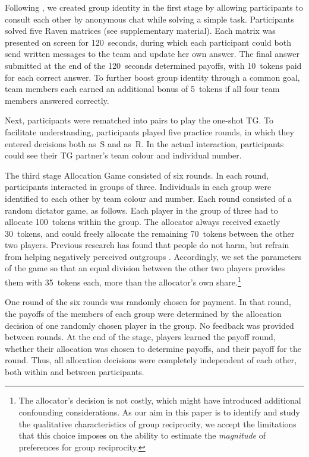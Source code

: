 \documentclass[12pt,a4paper]{article}\usepackage[]{graphicx}\usepackage[]{color}
\begin{document}
Following \citep{chen2009group}, we created group identity in the
first stage by allowing participants to consult each other by anonymous
chat while solving a simple task. Participants solved five Raven matrices
(see supplementary material). Each matrix was presented on screen
for 120~seconds, during which each participant could both send written
messages to the team and update her own answer. The final answer submitted
at the end of the 120~seconds determined payoffs, with 10~tokens
paid for each correct answer. To further boost group identity through
a common goal, team members each earned an additional bonus of 5~tokens
if all four team members answered correctly.

Next, participants were rematched into pairs to play the one-shot
TG. To facilitate understanding, participants played five practice
rounds, in which they entered decisions both as~S and as~R. In the
actual interaction, participants could see their TG partner's team
colour and individual number.

The third stage Allocation Game consisted of six rounds. In each round, participants interacted in groups of three. Individuals in each group were identified to each other by
team colour and number. Each round consisted of a random dictator game, as
follows. Each player in the group of three had to allocate 100~tokens within the
group. The allocator always received exactly 30~tokens, and could freely allocate the
remaining 70~tokens between the other two players. Previous research has found that
people do not harm, but refrain from helping negatively perceived outgroups
\citep{weisel2015ingroup}. Accordingly, we set the parameters of the game so
that an equal division between the other two players provides them with 35~tokens each, more than the allocator's own share.\footnote{
  The allocator's decision is not costly, which might have introduced additional confounding considerations. As our aim in this paper is to identify and study the qualitative characteristics of group reciprocity, we accept the limitations that this choice imposes on the ability to estimate the \emph{magnitude} of preferences for group reciprocity.
}

One round of the six rounds was randomly chosen for payment. In that round, the payoffs of the members of each group were determined by the allocation decision of one randomly chosen player in the group. No feedback was provided between rounds. At the end of the stage, players learned the payoff round, whether their allocation was chosen to determine payoffs, and their payoff for the round. Thus, all allocation decisions were completely independent of each other, both within and between participants.
\end{document}
